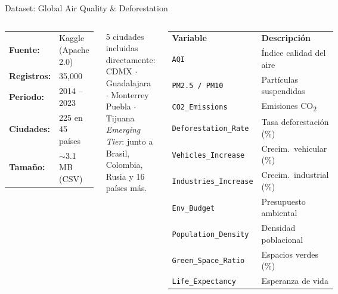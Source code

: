 \documentclass[aspectratio=169]{beamer}
\begin{document}
\begin{frame}{Dataset: Global Air Quality \& Deforestation}
\begin{columns}[T]
\vspace{-0.5cm}
\begin{tcolorbox}[colback=grisclaro, colframe=uaemcolor!60, title=\textbf{Descripción general}]
\small
\begin{tabular}{ll}
\textbf{Fuente:}    & Kaggle (Apache 2.0) \\
\textbf{Registros:} & 35{,}000 \\
\textbf{Periodo:}   & 2014 -- 2023 \\
\textbf{Ciudades:}  & 225 en 45 países \\
\textbf{Tamaño:}    & $\sim$3.1 MB (CSV) \\
\end{tabular}
\end{tcolorbox}

\vspace{0.2cm}
\begin{tcolorbox}[colback=verdeenv!6, colframe=verdeenv!60, title=\textbf{México en el dataset}]
\small
5 ciudades incluidas directamente:\\[3pt]
CDMX $\cdot$ Guadalajara $\cdot$ Monterrey\\
Puebla $\cdot$ Tijuana\\[3pt]
\footnotesize\textit{Emerging Tier}: junto a Brasil, Colombia,\\Rusia y 16 países más.
\end{tcolorbox}

\vspace{-0.3cm}
\begin{tcolorbox}[colback=grisclaro, colframe=black!25, title=\textbf{Variables (15 columnas)}]
\small
\begin{tabular}{ll}
\vspace{0.1cm}
\textbf{Variable} & \textbf{Descripción} \\
\vspace{0.1cm}
\texttt{AQI}                  & Índice calidad del aire \\
\texttt{PM2.5 / PM10}         & Partículas suspendidas \\
\texttt{CO2\_Emissions}       & Emisiones CO\textsubscript{2} \\
\texttt{Deforestation\_Rate}  & Tasa deforestación (\%) \\
\texttt{Vehicles\_Increase}   & Crecim.\ vehicular (\%) \\
\texttt{Industries\_Increase} & Crecim.\ industrial (\%) \\
\texttt{Env\_Budget}          & Presupuesto ambiental \\
\texttt{Population\_Density}  & Densidad poblacional \\
\texttt{Green\_Space\_Ratio}  & Espacios verdes (\%) \\
\texttt{Life\_Expectancy}     & Esperanza de vida \\


\end{tabular}
\end{tcolorbox}
\end{columns}
\end{frame}
\end{document}
